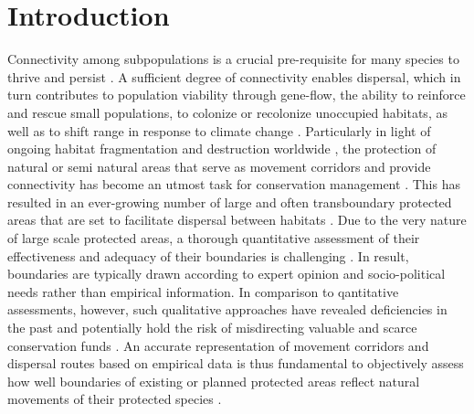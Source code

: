 \documentclass[abstract=on,10pt,a4paper,bibliography=totocnumbered]{article}
\begin{document}
\newpage


\linenumbers

\section{Introduction}
Connectivity among subpopulations is a crucial pre-requisite for many species to
thrive and persist \citep{Fahrig.2003}. A sufficient degree of connectivity
enables dispersal, which in turn contributes to population viability through
gene-flow, the ability to reinforce and rescue small populations, to colonize or
recolonize unoccupied habitats, as well as to shift range in response to climate
change \citep{Brown.1977, Hanski.1998, MacArthur.2001, Frankham.2002,
Heller.2009, Leigh.2012}. Particularly in light of ongoing habitat fragmentation
and destruction worldwide \citep{Fahrig.2003, Lindenmayer.2013}, the protection
of natural or semi natural areas that serve as movement corridors and provide
connectivity has become an utmost task for conservation management
\citep{Heller.2009, Doerr.2011, Rudnick.2012, Cozzi.2020}. This has resulted in
an ever-growing number of large and often transboundary protected areas that are
set to facilitate dispersal between habitats \citep{Wolmer.2003}. Due to the
very nature of large scale protected areas, a thorough quantitative assessment
of their effectiveness and adequacy of their boundaries is challenging
\citep{Rudnick.2012}. In result, boundaries are typically drawn according to
expert opinion and socio-political needs rather than empirical information. In
comparison to qantitative assessments, however, such qualitative approaches have
revealed deficiencies in the past and potentially hold the risk of misdirecting
valuable and scarce conservation funds \citep{Pullinger.2010, Sawyer.2011}. An
accurate representation of movement corridors and dispersal routes based on
empirical data is thus fundamental to objectively assess how well boundaries of
existing or planned protected areas reflect natural movements of their protected
species \citep{Beier.2008, Doerr.2011, Rudnick.2012}.
\end{document}
